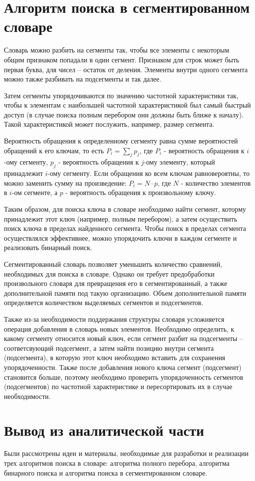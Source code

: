 \section{Алгоритм поиска в сегментированном словаре}

Словарь можно разбить на сегменты так, чтобы все элементы с некоторым общим признаком попадали в один сегмент. Признаком для строк может быть первая буква, для чисел -- остаток от деления. Элементы внутри одного сегмента можно также разбивать на подсегменты и так далее.

Затем сегменты упорядочиваются по значению частотной характеристики так, чтобы к элементам с наибольшей частотной характеристикой был самый быстрый доступ (в случае поиска полным перебором они должны быть ближе к началу). Такой характеристикой может послужить, например, размер сегмента. 

Вероятность обращения к определенному сегменту равна сумме вероятностей обращений к его ключам, то есть $P_i = \sum_{j}p_j$, где $P_i$ - вероятность обращения к $i$-ому сегменту, $p_j$ - вероятность обращения к $j$-ому элементу, который принадлежит $i$-ому сегменту. Если обращения ко всем ключам равновероятны, то можно заменить сумму на произведение: $P_i = N \cdot p$, где $N$ - количество элементов в $i$-ом сегменте, а $p$ - вероятность обращения к произвольному ключу.

Таким образом, для поиска ключа в словаре необходимо найти сегмент, которму принадлежит этот ключ (например, полным перебором), а затем осуществить поиск ключа в пределах найденного сегмента. Чтобы поиск в пределах сегмента осуществлялся эффективнее, можно упорядочить ключи в каждом сегменте и реализовать бинарный поиск. 

Сегментированный словарь позволяет уменьшить количество сравнений, необходимых для поиска в словаре. Однако он требует предобработки произвольного словаря для превращения его в сегментированный, а также дополнительной памяти под такую организацию. Объем дополнительной памяти определяется количеством выделяемых сегментов и подсегментов.

Также из-за необходимости поддержания структуры словаря усложняется операция добавления в словарь новых элементов. Необходимо определить, к какому сегменту относится новый ключ, если сегмент разбит на подсегменты -- соответсвующий подсегмент, а затем найти позицию внутри сегмента (подсегмента), в которую этот ключ необходимо вставить для сохранения упорядоченности. Также после добавления нового ключа сегмент (подсегмент) становится больше, поэтому необходимо проверить упорядоченность сегментов (подсегментов) по частотной характеристике и пересортировать их в случае необходимости. 

\section{Вывод из аналитической части}
Были рассмотрены идеи и материалы, необходимые для  разработки и реализации трех алгоритмов поиска в словаре: алгоритма полного перебора, алгоритма бинарного поиска и алгоритма поиска в сегментированном словаре. 

